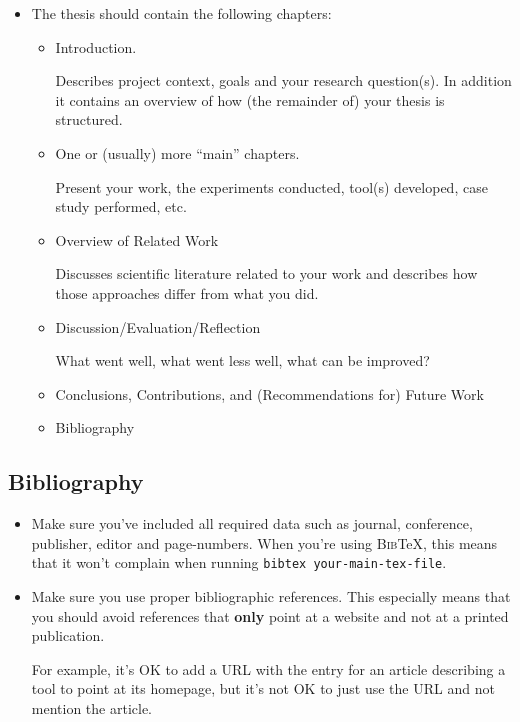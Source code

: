 \begin{itemize}
\item The thesis should contain the following chapters:
\begin{itemize}
\item Introduction.

  Describes project context, goals and your research question(s). In
  addition it contains an overview of how (the remainder of) your
  thesis is structured.

\item One or (usually) more ``main'' chapters.

  Present your work, the experiments conducted, tool(s) developed,
  case study performed, etc.

\item Overview of Related Work

  Discusses scientific literature related to your work and describes
  how those approaches differ from what you did.

\item Discussion/Evaluation/Reflection

  What went well, what went less well, what can be improved?

\item Conclusions, Contributions, and (Recommendations for) Future Work

\item Bibliography

\end{itemize}
\end{itemize}


\subsection{Bibliography}

\begin{itemize}
\item Make sure you've included all required data such as journal,
  conference, publisher, editor and page-numbers. When you're using
  \textsc{Bib}\TeX{}, this means that it won't complain when running
  \texttt{bibtex your-main-tex-file}.

\item Make sure you use proper bibliographic references. This
  especially means that you should avoid references that \textbf{only}
  point at a website and not at a printed publication.

  For example, it's OK to add a URL with the entry for an article
  describing a tool to point at its homepage, but it's not OK to just
  use the URL and not mention the article.
\end{itemize}


